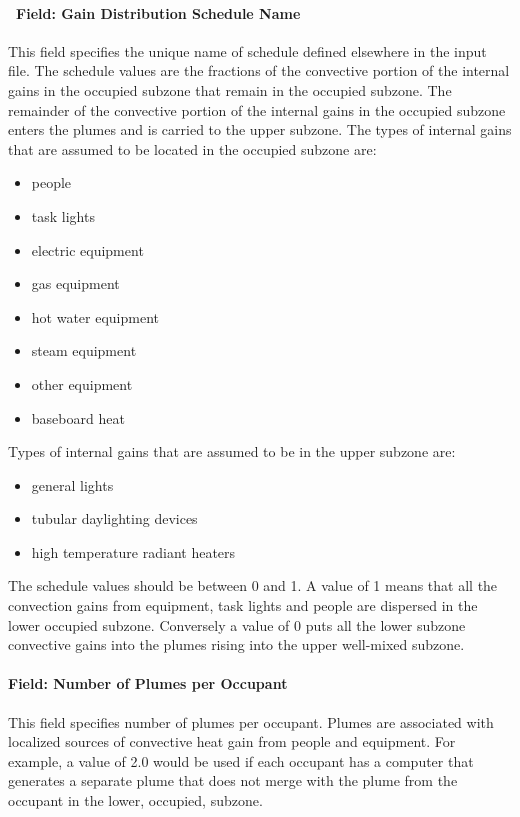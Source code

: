 \paragraph{~Field: Gain Distribution Schedule Name}\label{field-gain-distribution-schedule-name}

This field specifies the unique name of schedule defined elsewhere in the input file. The schedule values are the fractions of the convective portion of the internal gains in the occupied subzone that remain in the occupied subzone. The remainder of the convective portion of the internal gains in the occupied subzone enters the plumes and is carried to the upper subzone. The types of internal gains that are assumed to be located in the occupied subzone are:

\begin{itemize}
\item
  people
\item
  task lights
\item
  electric equipment
\item
  gas equipment
\item
  hot water equipment
\item
  steam equipment
\item
  other equipment
\item
  baseboard heat
\end{itemize}

Types of internal gains that are assumed to be in the upper subzone are:

\begin{itemize}
\item
  general lights
\item
  tubular daylighting devices
\item
  high temperature radiant heaters
\end{itemize}

The schedule values should be between 0 and 1. A value of 1 means that all the convection gains from equipment, task lights and people are dispersed in the lower occupied subzone. Conversely a value of 0 puts all the lower subzone convective gains into the plumes rising into the upper well-mixed subzone.

\paragraph{Field: Number of Plumes per Occupant}\label{field-number-of-plumes-per-occupant}

This field specifies number of plumes per occupant. Plumes are associated with localized sources of convective heat gain from people and equipment. For example, a value of 2.0 would be used if each occupant has a computer that generates a separate plume that does not merge with the plume from the occupant in the lower, occupied, subzone.

